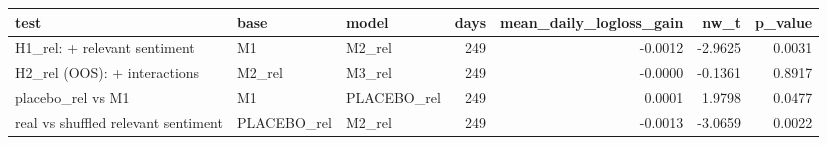 \begin{tabular}{lllrrrr}
\toprule
test & base & model & days & mean\_daily\_logloss\_gain & nw\_t & p\_value \\
\midrule
H1\_rel: + relevant sentiment & M1 & M2\_rel & 249 & -0.0012 & -2.9625 & 0.0031 \\
H2\_rel (OOS): + interactions & M2\_rel & M3\_rel & 249 & -0.0000 & -0.1361 & 0.8917 \\
placebo\_rel vs M1 & M1 & PLACEBO\_rel & 249 & 0.0001 & 1.9798 & 0.0477 \\
real vs shuffled relevant sentiment & PLACEBO\_rel & M2\_rel & 249 & -0.0013 & -3.0659 & 0.0022 \\
\bottomrule
\end{tabular}
